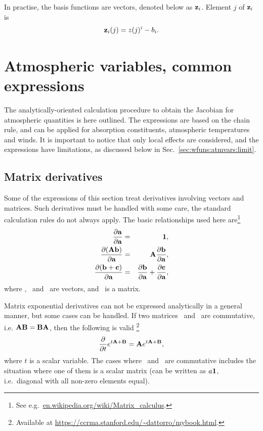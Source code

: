 In practise, the basis functions are vectors, denoted below as $\mathbf{z}_i$.
Element $j$ of $\mathbf{z}_i$ is
\begin{equation}
  \mathbf{z}_i(j) = z(j)^i - b_i.
\end{equation}




\section{Atmospheric variables, common expressions}
\label{sec:wfuns:atmvars}
%
The analytically-oriented calculation procedure to obtain the Jacobian for
atmospheric quantities is here outlined. The expressions are based on the
chain rule, and can be applied for absorption constituents, atmospheric
temperatures and winds. It is important to notice that only local effects are
considered, and the expressions have limitations, as discussed below in
Sec.~\ref{sec:wfuns:atmvars:limit}.


\subsection{Matrix derivatives}
\label{sec:wfuns:atmvars:matder}
%
Some of the expressions of this section treat derivatives involving vectors
and matrices. Such derivatives must be handled with some care, the standard
calculation rules do not always apply. The basic relationships used here
are\footnote{See e.g.\ \url{en.wikipedia.org/wiki/Matrix_calculus}.}
\begin{eqnarray}
  \frac{\partial\mathbf{a}}{\partial\mathbf{a}} &=& 
    \mathbf{1}, \\
  \frac{\partial(\mathbf{A}\mathbf{b})}{\partial\mathbf{a}} &=& 
    \mathbf{A}\frac{\partial\mathbf{b}}{\partial\mathbf{a}}, \\
  \frac{\partial(\mathbf{b}+\mathbf{c})}{\partial\mathbf{a}} &=& 
    \frac{\partial\mathbf{b}}{\partial\mathbf{a}}+
    \frac{\partial\mathbf{c}}{\partial\mathbf{a}},
\end{eqnarray}
where , \ and \ are vectors, and \ is a
matrix.

Matrix exponential derivatives can not be expressed analytically in a general
manner, but some cases can be handled. If two matrices \ and
\ are commutative, i.e. $\mathbf{A}\mathbf{B}=\mathbf{B}\mathbf{A}$,
then the following is valid \citep{Dattorro2011}\footnote{Available at
  \url{https://ccrma.stanford.edu/~dattorro/mybook.html}.}
\begin{equation}
  \label{eq:expmder}
  \frac{\partial}{\partial t} e^{t\mathbf{A}+\mathbf{B}} = 
       \mathbf{A}e^{t\mathbf{A}+\mathbf{B}},
\end{equation}
where $t$ is a scalar variable.
The cases where \ and \ are commutative includes the
situation where one of them is a scalar matrix (can be written as $a\mathbf{1}$,
i.e.\ diagonal with all non-zero elements equal).




